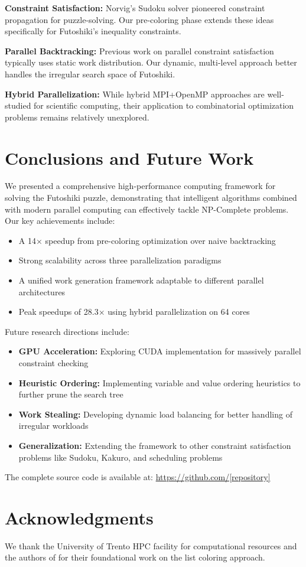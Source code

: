 \documentclass[10pt, conference]{IEEEtran}
\begin{document}
\textbf{Constraint Satisfaction:} Norvig's Sudoku solver \cite{NorvigSudoku} pioneered constraint propagation for puzzle-solving. Our pre-coloring phase extends these ideas specifically for Futoshiki's inequality constraints.

\textbf{Parallel Backtracking:} Previous work on parallel constraint satisfaction \cite{Pacheco2011} typically uses static work distribution. Our dynamic, multi-level approach better handles the irregular search space of Futoshiki.

\textbf{Hybrid Parallelization:} While hybrid MPI+OpenMP approaches are well-studied for scientific computing, their application to combinatorial optimization problems remains relatively unexplored.

\section{Conclusions and Future Work}
We presented a comprehensive high-performance computing framework for solving the Futoshiki puzzle, demonstrating that intelligent algorithms combined with modern parallel computing can effectively tackle NP-Complete problems. Our key achievements include:

\begin{itemize}
    \item A 14× speedup from pre-coloring optimization over naive backtracking
    \item Strong scalability across three parallelization paradigms
    \item A unified work generation framework adaptable to different parallel architectures
    \item Peak speedups of 28.3× using hybrid parallelization on 64 cores
\end{itemize}

Future research directions include:
\begin{itemize}
    \item \textbf{GPU Acceleration:} Exploring CUDA implementation for massively parallel constraint checking
    \item \textbf{Heuristic Ordering:} Implementing variable and value ordering heuristics to further prune the search tree
    \item \textbf{Work Stealing:} Developing dynamic load balancing for better handling of irregular workloads
    \item \textbf{Generalization:} Extending the framework to other constraint satisfaction problems like Sudoku, Kakuro, and scheduling problems
\end{itemize}

The complete source code is available at: \url{https://github.com/[repository]}

\section*{Acknowledgments}
We thank the University of Trento HPC facility for computational resources and the authors of \cite{Sen2024Futoshiki} for their foundational work on the list coloring approach.



\end{document}
